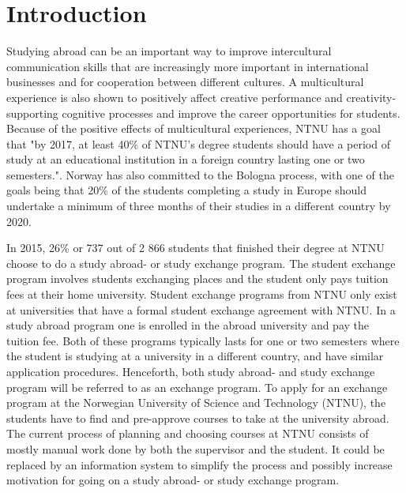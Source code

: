 
\chapter{Introduction}
Studying abroad can be an important way to improve intercultural communication skills that are increasingly more important in international businesses and for cooperation between different cultures.\cite{williams2005exploring} A multicultural experience is also shown to positively affect creative performance and creativity-supporting
cognitive processes\cite{leung2008multicultural} and improve the career opportunities for students\cite{brandenburg2014erasmus}. Because of the positive effects of multicultural experiences, NTNU has a goal that "by 2017, at least 40\% of NTNU's degree students should have a period of study at an educational institution in a foreign country lasting one or two semesters."\cite{internasjonal_plan}. Norway has also committed to the Bologna process, with one of the goals being that 20\% of the students completing a study in Europe should undertake a minimum of three months of their studies in a different country by 2020\cite{2020_Bologna}.


In 2015, 26\% or 737 out of 2 866 students that finished their degree at NTNU choose to do a study abroad- or study exchange program\cite{studentutveksling_andel}. The student exchange program involves students exchanging places and the student only pays tuition fees at their home university. Student exchange programs from NTNU only exist at universities that have a formal student exchange agreement with NTNU. In a study abroad program one is enrolled in the abroad university and pay the tuition fee. Both of these programs typically lasts for one or two semesters where the student is studying at a university in a different country, and have similar application procedures. Henceforth, both study abroad- and study exchange program will be referred to as an exchange program. To apply for an exchange program at the Norwegian University of Science and Technology (NTNU), the students have to find and pre-approve courses to take at the university abroad. The current process of planning and choosing courses at NTNU consists of mostly manual work done by both the supervisor and the student. It could be replaced by an information system to simplify the process and possibly increase motivation for going on a study abroad- or study exchange program.

